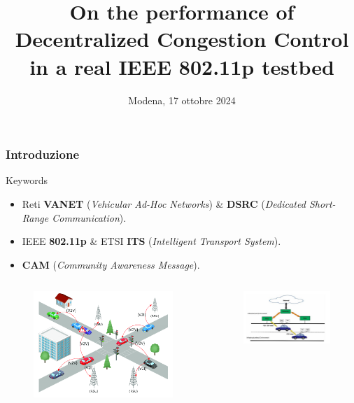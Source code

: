 \documentclass{beamer}
\title[DCC performance in IEEE 802.11p] %
{On the performance of Decentralized Congestion Control in a real IEEE 802.11p testbed}
\institute[] %
{
    \fontsize{11}{13}\selectfont \textbf{Relatore: Prof. Carlo Augusto Grazia}
    \and
    Esame di Automotive Connectivity\\
    Corso di Laurea Magistrale in Ingegneria Informatica\\
    Percorso "\textit{Cloud \& Cybersecurity}"
    \and
    Dipartimento di Ingegneria "Enzo Ferrari"\\
    Università degli studi di Modena e Reggio Emilia
}
\date[17 ottobre 2024] %
{Modena, 17 ottobre 2024}
\begin{document}
\frame{\titlepage}

\begin{frame}
\frametitle{Introduzione}
\centering
\begin{block}{Keywords}
    \begin{itemize}
        \item Reti \textbf{VANET} (\textit{Vehicular Ad-Hoc Networks}) \& \textbf{DSRC} (\textit{Dedicated Short-Range Communication}).
        \item IEEE \textbf{802.11p} \& ETSI \textbf{ITS} (\textit{Intelligent Transport System}).
        \item \textbf{CAM} (\textit{Community Awareness Message}).
    \end{itemize}
\end{block}

\begin{columns}
    \begin{column}{0.5\textwidth}
        \begin{figure}[h!]
            \centering
            \includegraphics[width=1\textwidth]{vanet.png}
            \label{fig:vanet}
        \end{figure}
    \end{column}
    \begin{column}{0.5\textwidth}
        \begin{figure}[h!]
            \centering
            \includegraphics[width=1\textwidth]{routing_vanet.jpeg}

\end{figure}
\end{column}
\end{columns}
\end{frame}
\end{document}

